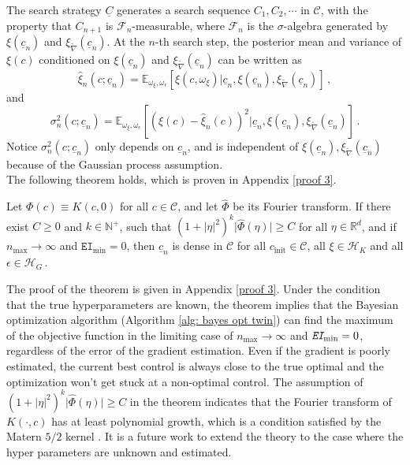 The search strategy $\underline{C}$ generates a search sequence $C_1, C_2, \cdots$ 
in $\mathcal{C}$,
with the property that $C_{n+1}$ is $\mathcal{F}_n$-measurable, where 
$\mathcal{F}_n$ is the $\sigma$-algebra generated by
$\xi(\underline{c}_n)$ and $\xi_{\tilde{\nabla}}(\underline{c}_n)$.
At the $n$-th search step, 
the posterior mean and variance of $\xi(c)$ conditioned on 
$\xi(\underline{c}_n)$ and $\xi_{\tilde{\nabla}}(\underline{c}_n)$ can be written as
\begin{equation} 
    \hat{\xi}_n(c; \underline{c}_n) 
    = \mathbb{E}_{\omega_\xi, \omega_\epsilon}\left[ \xi(c, \omega_\xi) \Big|
                          \underline{c}_n, \xi(\underline{c}_n), 
                          \xi_{\tilde{\nabla}}(\underline{c}_n) \right]\,,
    \label{cond expectation}
\end{equation}
and
\begin{equation}
    \sigma_n^2(c;\underline{c}_n) = \mathbb{E}_{\omega_\xi, \omega_\epsilon}\left[\left(
        \xi(c) - \hat{\xi}_n(c)\right)^2 \Big| \underline{c}_n,
        \xi(\underline{c}_n), \xi_{\tilde{\nabla}}(\underline{c}_n)
        \right]\,.
\end{equation}
Notice $\sigma_n^2(c;\underline{c}_n)$ only depends on $\underline{c}_n$, and is independent 
of $\xi(\underline{c}_n), \xi_{\tilde{\nabla}}(\underline{c}_n)$ because of the Gaussian process
assumption. \\

The following theorem holds, which is proven in Appendix \ref{proof 3}.\\
\begin{theorem}
    Let $\Phi(c) \equiv K(c, 0)$ for all $c\in \mathcal{C}$, and let
    $\hat{\Phi}$ be its Fourier transform.
    If there exist $C\ge 0$ and $k \in\mathbb{N}^+$, such that
    $(1+|\eta|^2)^k \big|\hat{\Phi}(\eta)\big|\ge C$ for all $\eta\in \mathbb{R}^d$, 
    and if $n_{\max}\rightarrow \infty$ and $\texttt{EI}_{\min} = 0$, then
    $\underline{c}_n$ is dense in $\mathcal{C}$
    for all $c_{\textrm{init}}\in \mathcal{C}$, all $\xi\in \mathcal{H}_K$ and all $\epsilon \in
    \mathcal{H}_G\,$.
    \label{theorem: 3}
\end{theorem}

The proof of the theorem is given in Appendix \ref{proof 3}.
Under the condition that the true hyperparameters are known,
the theorem implies that
the Bayesian optimization algorithm (Algorithm \ref{alg: bayes opt twin})
can find the maximum of the objective function in the limiting case of
$n_{\max}\rightarrow \infty$ and $\textit{\texttt{EI}}_{\min} = 0$,
regardless of the error of the gradient estimation.
Even if the gradient is poorly estimated,
the current best control is always 
close to the true optimal and the optimization won't get stuck at a non-optimal control.
The assumption of $(1+|\eta|^2)^k \big|\hat{\Phi}(\eta)\big|\ge C$ in the theorem 
indicates that the Fourier transform of $K(\cdot, c)$ has at least polynomial growth,
which is a condition satisfied by the Matern $5/2$ kernel \cite{convergen EI}.
It is a future work to extend the theory to the case where the hyper parameters are unknown
and estimated.\\


